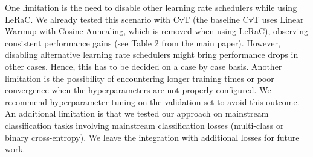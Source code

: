 \documentclass[10pt,twocolumn,letterpaper]{article}
\begin{document}
One limitation is the need to disable other learning rate schedulers while using LeRaC. We already tested this scenario with CvT (the baseline CvT uses Linear Warmup with Cosine Annealing, which is removed when using LeRaC), observing consistent performance gains (see Table 2 from the main paper). However, disabling alternative learning rate schedulers might bring performance drops in other cases. Hence, this has to be decided on a case by case basis. Another limitation is the possibility of encountering longer training times or poor convergence when the hyperparameters are not properly configured. We recommend hyperparameter tuning on the validation set to avoid this outcome. An additional limitation is that we tested our approach on mainstream classification tasks involving mainstream classification losses (multi-class or binary cross-entropy). We leave the integration with additional losses for future work.
\end{document}
